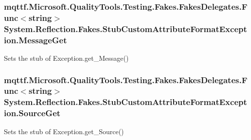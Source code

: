 \hypertarget{class_system_1_1_reflection_1_1_fakes_1_1_stub_custom_attribute_format_exception_ad09d63977a646e87f3619cd19fc719e5}{
\subsubsection[{Message\-Get}]{\setlength{\rightskip}{0pt plus 5cm}mqttf.\-Microsoft.\-Quality\-Tools.\-Testing.\-Fakes.\-Fakes\-Delegates.\-Func$<$string$>$ System.\-Reflection.\-Fakes.\-Stub\-Custom\-Attribute\-Format\-Exception.\-Message\-Get}}\label{class_system_1_1_reflection_1_1_fakes_1_1_stub_custom_attribute_format_exception_ad09d63977a646e87f3619cd19fc719e5}


Sets the stub of Exception.\-get\-\_\-\-Message()

\hypertarget{class_system_1_1_reflection_1_1_fakes_1_1_stub_custom_attribute_format_exception_a42ad2859009422105150035ea36d908f}{
\subsubsection[{Source\-Get}]{\setlength{\rightskip}{0pt plus 5cm}mqttf.\-Microsoft.\-Quality\-Tools.\-Testing.\-Fakes.\-Fakes\-Delegates.\-Func$<$string$>$ System.\-Reflection.\-Fakes.\-Stub\-Custom\-Attribute\-Format\-Exception.\-Source\-Get}}\label{class_system_1_1_reflection_1_1_fakes_1_1_stub_custom_attribute_format_exception_a42ad2859009422105150035ea36d908f}


Sets the stub of Exception.\-get\-\_\-\-Source()

